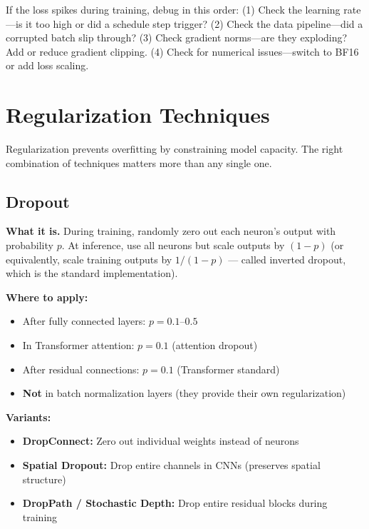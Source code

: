 \begin{warningbox}
If the loss spikes during training, debug in this order: (1) Check the learning rate---is it too high or did a schedule step trigger? (2) Check the data pipeline---did a corrupted batch slip through? (3) Check gradient norms---are they exploding? Add or reduce gradient clipping. (4) Check for numerical issues---switch to BF16 or add loss scaling.
\end{warningbox}

\section{Regularization Techniques}
\label{sec:regularization}

Regularization prevents overfitting by constraining model capacity. The right combination of techniques matters more than any single one.

\subsection{Dropout}

\textbf{What it is.} During training, randomly zero out each neuron's output with probability $p$. At inference, use all neurons but scale outputs by $(1-p)$ (or equivalently, scale training outputs by $1/(1-p)$ --- called inverted dropout, which is the standard implementation).

\textbf{Where to apply:}
\begin{itemize}
    \item After fully connected layers: $p = 0.1$--$0.5$
    \item In Transformer attention: $p = 0.1$ (attention dropout)
    \item After residual connections: $p = 0.1$ (Transformer standard)
    \item \textbf{Not} in batch normalization layers (they provide their own regularization)
\end{itemize}

\textbf{Variants:}
\begin{itemize}
    \item \textbf{DropConnect:} Zero out individual weights instead of neurons
    \item \textbf{Spatial Dropout:} Drop entire channels in CNNs (preserves spatial structure)
    \item \textbf{DropPath / Stochastic Depth:} Drop entire residual blocks during training
\end{itemize}

